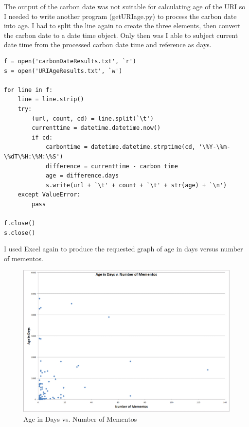 \documentclass{article}
\begin{document}
The output of the carbon date was not suitable for calculating age of the URI so I needed to write another program (getURIage.py) to process the carbon date into age. I had to split the line again to create the three elements, then convert the carbon date to a date time object. Only then was I able to subject current date time from the processed carbon date time and reference as days.

\begin{lstlisting}
f = open('carbonDateResults.txt', `r')
s = open('URIAgeResults.txt', `w')

for line in f:
    line = line.strip()
    try:
        (url, count, cd) = line.split(`\t')
        currenttime = datetime.datetime.now()
        if cd:
            carbontime = datetime.datetime.strptime(cd, '\%Y-\%m-\%dT\%H:\%M:\%S')
            difference = currenttime - carbon time
            age = difference.days
            s.write(url + `\t' + count + `\t' + str(age) + `\n')
    except ValueError:
        pass

f.close()
s.close()

\end{lstlisting}

I used Excel again to produce the requested graph of age in days versus number of mementos.

\begin{figure}[H]
\centering
\includegraphics[scale=0.25]{q3/uriAgeGraph}
\caption{Age in Days vs. Number of Mementos}
\label{agevmementos}
\end{figure}
\end{document}
